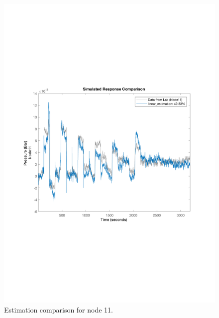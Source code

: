 \begin{figure}[H]
\begin{minipage}[b]{0.45\textwidth}
    \includegraphics[width=\textwidth]{report/pictures/Node11_estimation_1.pdf}
    \caption{Estimation comparison for node 11.}
  \end{minipage}
\end{figure}

